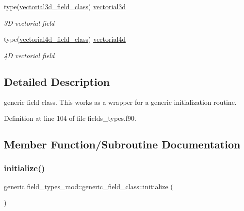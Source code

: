 \begin{DoxyCompactItemize}
type(\mbox{\hyperlink{structfield__types__mod_1_1vectorial3d__field__class}{vectorial3d\+\_\+field\+\_\+class}}) \mbox{\hyperlink{structfield__types__mod_1_1generic__field__class_ab83038aec40a2449f0113a8d7b8fa388}{vectorial3d}}
\begin{DoxyCompactList}\small\item\em 3D vectorial field \end{DoxyCompactList}\item 
type(\mbox{\hyperlink{structfield__types__mod_1_1vectorial4d__field__class}{vectorial4d\+\_\+field\+\_\+class}}) \mbox{\hyperlink{structfield__types__mod_1_1generic__field__class_aacaaa8b6fccdfca7ac5c88104e6dab57}{vectorial4d}}
\begin{DoxyCompactList}\small\item\em 4D vectorial field \end{DoxyCompactList}\end{DoxyCompactItemize}


\subsection{Detailed Description}
generic field class. This works as a wrapper for a generic initialization routine. 

Definition at line 104 of file fields\+\_\+types.\+f90.



\subsection{Member Function/\+Subroutine Documentation}
\mbox{\label{structfield__types__mod_1_1generic__field__class_ae53b0ee80d41ad66189ad515edc23a3c}} 
\subsubsection{\texorpdfstring{initialize()}{initialize()}}
{\footnotesize\ttfamily generic field\+\_\+types\+\_\+mod\+::generic\+\_\+field\+\_\+class\+::initialize (\begin{DoxyParamCaption}{ }\end{DoxyParamCaption})\hspace{0.3cm}{\ttfamily [private]}}




